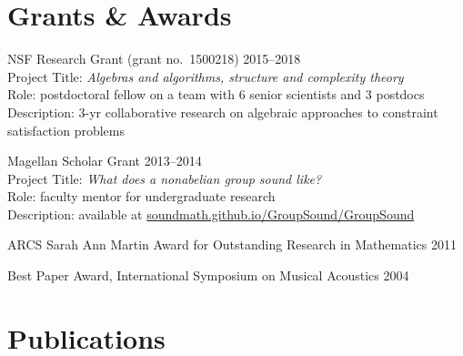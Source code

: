 \documentclass[margin,line]{resume}
\begin{document}
\begin{resume}
    \vspace{-1mm}
    \section{\mysidestyle Grants \& Awards}

    NSF Research Grant {\small (grant no.~1500218)} \hfill 2015--2018\\
    Project Title: \textsl{Algebras and algorithms, structure and complexity theory}\\ 
    Role: postdoctoral fellow on a team with 6 senior scientists and 3 postdocs\\
    Description: 3-yr collaborative research on algebraic approaches to constraint satisfaction problems

    \vspace{-1mm}
    Magellan Scholar Grant \hfill     2013--2014\\
    Project Title: \textsl{What does a nonabelian group sound like?}\\
    Role: faculty mentor for undergraduate research\\
    Description: available at {\small \href{http://soundmath.github.io/GroupSound/}{soundmath.github.io/GroupSound/GroupSound}}

    \vspace{-2mm}
    ARCS Sarah Ann Martin Award for Outstanding Research in Mathematics \hfill 2011

    \vspace{-2mm}
    Best Paper Award, International Symposium on Musical Acoustics \hfill  2004 

\vskip-2mm
    \section{\mysidestyle Publications}

    
    




\end{resume}
\end{document}
